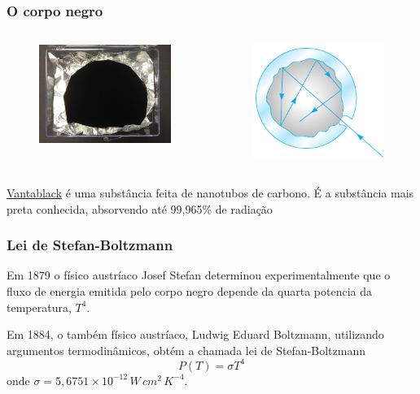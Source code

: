 \documentclass[12pt,brazil]{beamer}
\begin{document}

\begin{frame}
  \frametitle{O corpo negro}
    \begin{columns}[c]
  
    \column{5cm}
      \begin{figure}
        \includegraphics[width=4.5cm]{figuras/fig05}
      \end{figure}
      
    \column{5cm}
      \begin{figure}
        \includegraphics[width=4.5cm]{figuras/fig04}
      \end{figure}
      
    \end{columns}
    
    \href{https://www.youtube.com/watch?v=fg2x0L4YAuU}{\color{blue} Vantablack} é uma substância feita de nanotubos de carbono. É a substância mais preta conhecida, absorvendo até 99,965\% de radiação
\end{frame}




\begin{frame}
  \frametitle{Lei de Stefan-Boltzmann}

        \fontsize{12pt}{11pt}\selectfont
        Em 1879 o físico austríaco Josef Stefan determinou experimentalmente que o fluxo de energia emitida pelo corpo negro depende da quarta potencia da temperatura, $T^4$. 
        \vspace{0.2cm}
        
        Em 1884, o também físico austríaco, Ludwig Eduard Boltzmann, utilizando argumentos termodinâmicos, obtém a chamada lei de Stefan-Boltzmann        
        \[
         P(T) = \sigma T^4
        \]
        onde $\sigma = 5,6751\times 10^{-12}\,W\,cm^2\,K^{-4}$.  

\end{frame}
\end{document}
